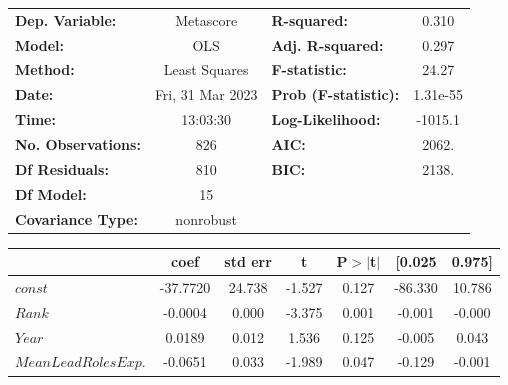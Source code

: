     \begin{center}
        \begin{tabular}{lclc}
        \toprule
        \textbf{Dep. Variable:}            &    Metascore     & \textbf{  R-squared:         } &     0.310   \\
        \textbf{Model:}                    &       OLS        & \textbf{  Adj. R-squared:    } &     0.297   \\
        \textbf{Method:}                   &  Least Squares   & \textbf{  F-statistic:       } &     24.27   \\
        \textbf{Date:}                     & Fri, 31 Mar 2023 & \textbf{  Prob (F-statistic):} &  1.31e-55   \\
        \textbf{Time:}                     &     13:03:30     & \textbf{  Log-Likelihood:    } &   -1015.1   \\
        \textbf{No. Observations:}         &         826      & \textbf{  AIC:               } &     2062.   \\
        \textbf{Df Residuals:}             &         810      & \textbf{  BIC:               } &     2138.   \\
        \textbf{Df Model:}                 &          15      & \textbf{                     } &             \\
        \textbf{Covariance Type:}          &    nonrobust     & \textbf{                     } &             \\
        \bottomrule
        \end{tabular}
        \begin{tabular}{lcccccc}
                                           & \textbf{coef} & \textbf{std err} & \textbf{t} & \textbf{P$> |$t$|$} & \textbf{[0.025} & \textbf{0.975]}  \\
        \midrule
        \textbf{$const$}                 &     -37.7720  &       24.738     &    -1.527  &         0.127        &      -86.330    &       10.786     \\
        \textbf{$Rank$}                  &      -0.0004  &        0.000     &    -3.375  &         0.001        &       -0.001    &       -0.000     \\
        \textbf{$Year$}                  &       0.0189  &        0.012     &     1.536  &         0.125        &       -0.005    &        0.043     \\
        \textbf{$Mean Lead Roles Exp.$}  &      -0.0651  &        0.033     &    -1.989  &         0.047        &       -0.129    &       -0.001     \\

\end{tabular}
\end{center}
